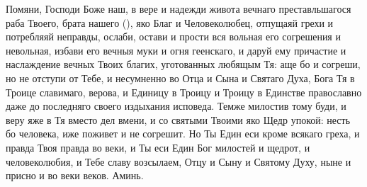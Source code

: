 \mychapterending


\begin{mymulticols}
 


Помяни, Господи Боже наш, в вере и надежди живота вечнаго преставльшагося раба Твоего, брата нашего (), яко Благ и Человеколюбец, отпущаяй грехи и потребляяй неправды, ослаби, остави и прости вся вольная его согрешения и невольная, избави его вечныя муки и огня геенскаго, и даруй ему причастие и наслаждение вечных Твоих благих, уготованных любящым Тя: аще бо и согреши, но не отступи от Тебе, и несумненно во Отца и Сына и Святаго Духа, Бога Тя в Троице славимаго, верова, и Единицу в Троицу и Троицу в Единстве православно даже до последняго своего издыхания исповеда. Темже милостив тому буди, и веру яже в Тя вместо дел вмени, и со святыми Твоими яко Щедр упокой: несть бо человека, иже поживет и не согрешит. Но Ты Един еси кроме всякаго греха, и правда Твоя правда во веки, и Ты еси Един Бог милостей и щедрот, и человеколюбия, и Тебе славу возсылаем, Отцу и Сыну и Святому Духу, ныне и присно и во веки веков. Аминь. 

\end{mymulticols}

\mychapterending


